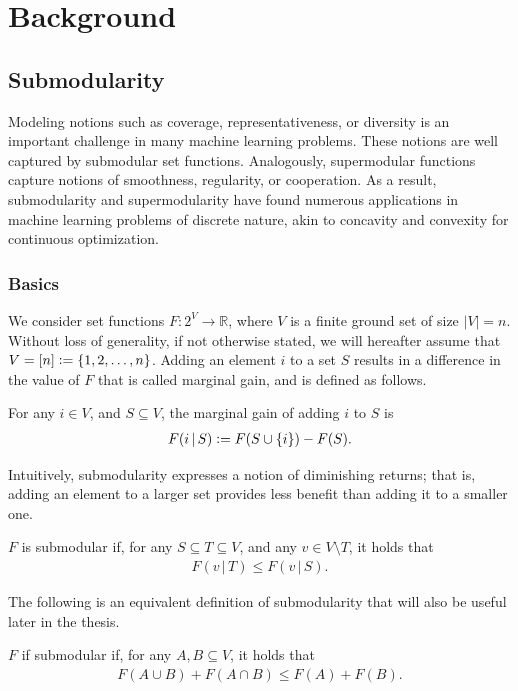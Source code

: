 \chapter{Background} \label{ch:background}

\section{Submodularity} \label{sect:bg_submod}

Modeling notions such as coverage, representativeness, or diversity is an important challenge in many machine learning problems.
These notions are well captured by submodular set functions.
Analogously, supermodular functions capture notions of smoothness, regularity, or cooperation. 
As a result, submodularity and supermodularity have found numerous applications in machine learning problems of discrete nature, akin to concavity and convexity for continuous optimization.

\subsection{Basics}
We consider set functions $F : 2^V \to \mathbb{R}$, where $V$ is a finite ground set of size $|V| = n$.
Without loss of generality, if not otherwise stated, we will hereafter assume that $V = [n] \vcentcolon= \{1, 2, \ldots,n\}$.
Adding an element $i$ to a set $S$ results in a difference in the value of $F$ that is called marginal gain, and is defined as follows.
\begin{definition}
For any $i \in V$, and $S \subseteq V$, the marginal gain of adding $i$ to $S$ is
\begin{align*}
F(i \,|\, S) \vcentcolon= F(S \cup \{i\}) - F(S).
\end{align*}
\end{definition}

Intuitively, submodularity expresses a notion of diminishing returns; that is, adding an element to a larger set provides less benefit than adding it to a smaller one.
\begin{definition}[Submodularity]
$F$ is submodular if, for any $S \subseteq T \subseteq V$, and any $v \in V \setminus T$, it holds that
\begin{align*}
F(v\,|\, T) \leq F(v\,|\, S).
\end{align*}
\end{definition}
\noindent The following is an equivalent definition of submodularity that will also be useful later in the thesis.
\begin{definition}[Submodularity] \label{def:submod}
$F$ if submodular if, for any $A, B \subseteq V$, it holds that
\begin{align*}
F(A \cup B) + F(A \cap B) \leq F(A) + F(B).
\end{align*}
\end{definition}

